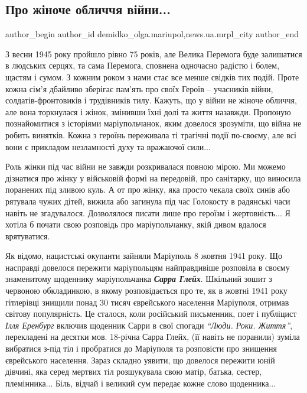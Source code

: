  
 
 
 
 
 
\subsection{Про жіноче обличчя війни...}
\label{sec:08_05_2020.stz.news.ua.mrpl_city.1.zhinoche_oblycchja_vijny}
 
\ifcmt
 author_begin
   author_id demidko_olga.mariupol,news.ua.mrpl_city
 author_end
\fi

З весни 1945 року пройшло рівно 75 років, але Велика Перемога буде залишатися в
людських серцях, та сама Перемога, сповнена одночасно радістю і болем, щастям і
сумом. З кожним роком з нами стає все менше свідків тих подій. Проте кожна
сім'я дбайливо зберігає пам'ять про своїх Героїв – учасників війни,
солдатів-фронтовиків і трудівників тилу. Кажуть, що у війни не жіноче обличчя,
але вона торкнулася і жінок, змінивши їхні долі та життя назавжди. Пропоную
познайомитися з історіями маріупольчанок, яким довелося зрозуміти, що війна не
робить винятків. Кожна з героїнь переживала ті трагічні події по-своєму, але
всі вони є прикладом незламності духу та вражаючої сили...

Роль жінки під час війни не завжди розкривалася повною мірою. Ми можемо
дізнатися про жінку у військовій формі на передовій, про санітарку, що виносила
поранених під зливою куль. А от про жінку, яка просто чекала своїх синів або
рятувала чужих дітей, вижила або загинула під час Голокосту в радянські часи
навіть не згадувалося. Дозволялося писати лише про героїзм і жертовність... Я
хотіла б почати свою розповідь про маріупольчанку, якій дивом вдалося
врятуватися.

Як відомо, нацистські окупанти зайняли Маріуполь 8 жовтня 1941 року. Що
насправді довелося пережити маріупольцям найправдивіше розповіла в своєму
знаменитому щоденнику маріупольчанка \emph{\textbf{Сарра Глейх}}. Шкільний зошит з червоною
обкладинкою, в якому розповідається про те, як в жовтні 1941 року гітлерівці
знищили понад 30 тисяч єврейського населення Маріуполя, отримав світову
популярність. Це сталося, коли російський письменник, поет і публіцист \emph{Ілля
Еренбург} включив щоденник Сарри в свої спогади \emph{\enquote{Люди. Роки. Життя}}, перекладені
на десятки мов. 18-річна Сарра Глейх, (її навіть не поранили) зуміла вибратися
з-під тіл і пробратися до Маріуполя та розповісти про знищення єврейського
населення. Зараз складно уявити, що довелося пережити юній дівчині, яка серед
мертвих тіл розшукувала свою матір, батька, сестер, племінника... Біль, відчай і
великий сум передає кожне слово щоденника... 

